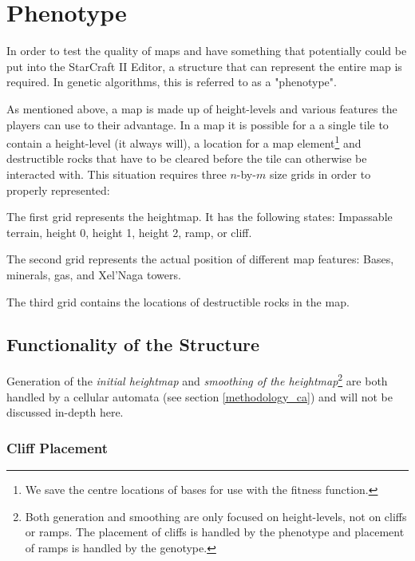 \section{Phenotype}
\label{methodology_phenotype}

In order to test the quality of maps and have something that potentially could be put into the StarCraft II Editor, a structure that can represent the entire map is required. In genetic algorithms, this is referred to as a "phenotype".

As mentioned above, a map is made up of height-levels and various features the players can use to their advantage. In a map it is possible for a a single tile to contain a height-level (it always will), a location for a map element\footnote{We save the centre locations of bases for use with the fitness function.} and destructible rocks that have to be cleared before the tile can otherwise be interacted with. This situation requires three $n$-by-$m$ size grids in order to properly represented:

\begin{my_itemize}

	\item The first grid represents the heightmap. It has the following states: Impassable terrain, height 0, height 1, height 2, ramp, or cliff.

	\item The second grid represents the actual position of different map features: Bases, minerals, gas, and Xel'Naga towers.

	\item The third grid contains the locations of destructible rocks in the map.

\end{my_itemize}

\subsection{Functionality of the Structure}
\label{methodology_phenotype_functionality}

Generation of the \textit{initial heightmap} and \textit{smoothing of the heightmap}\footnote{Both generation and smoothing are only focused on height-levels, not on cliffs or ramps. The placement of cliffs is handled by the phenotype and placement of ramps is handled by the genotype.} are both handled by a cellular automata (see section \ref{methodology_ca}) and will not be discussed in-depth here.

\subsubsection*{Cliff Placement}


